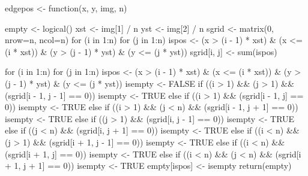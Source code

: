 

\begin{rcode}
edgepos <- function(x, y, img, n) {
  empty <- logical()
  xst <- img[1] / n
  yst <- img[2] / n
  sgrid <- matrix(0, nrow=n, ncol=n)
  for (i in 1:n) {
    for (j in 1:n) {
      ispos <- (x > (i - 1) * xst) & (x <= (i * xst)) &
               (y > (j - 1) * yst) & (y <= (j * yst))
      sgrid[i, j] <- sum(ispos)
    }
  }

  for (i in 1:n) {
    for (j in 1:n) {
      ispos <- (x > (i - 1) * xst) & (x <= (i * xst)) &
               (y > (j - 1) * yst) & (y <= (j * yst))
      isempty <- FALSE
      if ((i > 1) && (j > 1) && (sgrid[i - 1, j - 1] == 0))
        isempty <- TRUE
      else if ((i > 1) && (sgrid[i - 1, j] == 0))
        isempty <- TRUE
      else if ((i > 1) && (j < n) && (sgrid[i - 1, j + 1] == 0))
        isempty <- TRUE
      else if ((j > 1) && (sgrid[i, j - 1] == 0))
        isempty <- TRUE
      else if ((j < n) && (sgrid[i, j + 1] == 0))
        isempty <- TRUE
      else if ((i < n) && (j > 1) && (sgrid[i + 1, j - 1] == 0))
        isempty <- TRUE
      else if ((i < n) && (sgrid[i + 1, j] == 0))
        isempty <- TRUE
      else if ((i < n) && (j < n) && (sgrid[i + 1, j + 1] == 0))
        isempty <- TRUE
      empty[ispos] <- isempty
    }
  }
  return(empty)
}
\end{rcode}

